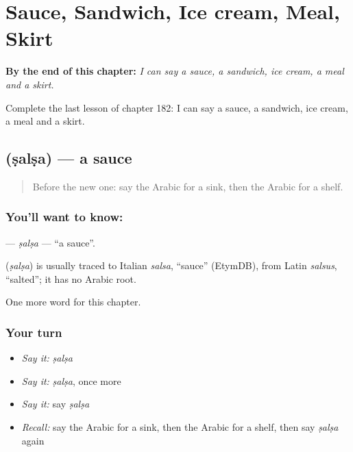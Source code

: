 
\chapter{Sauce, Sandwich, Ice cream, Meal, Skirt}
\label{ch:ar-sauce-sandwich-ice-cream-meal-skirt}

\begin{chapteropening}
\textbf{By the end of this chapter:} \emph{I can say a sauce, a sandwich, ice cream, a meal and a skirt.}

Complete the last lesson of chapter 182: I can say a sauce, a sandwich, ice cream, a meal and a skirt.
\end{chapteropening}

\section[\texorpdfstring{\ar{صلصة} (ṣalṣa)}{صلصة (ṣalṣa)}]{ (ṣalṣa) — a sauce}

\label{lesson:AR-C182-salsa}



\begin{quote}
Before the new one: say the Arabic for a sink, then the Arabic for a shelf.
\end{quote}

\subsection*{You'll want to know: }
\textbf{} — \emph{ṣalṣa} — \textquotedblleft{}a sauce\textquotedblright{}.

\begin{cousinweb}
\textbf{} (\emph{ṣalṣa}) is usually traced to Italian \emph{salsa}, \textquotedblleft{}sauce\textquotedblright{} (EtymDB), from Latin \emph{salsus}, \textquotedblleft{}salted\textquotedblright{}; it has no Arabic root.
\end{cousinweb}

\begin{grammarlens}[title={What you've built}]
One more word for this chapter.
\end{grammarlens}

\subsection*{Your turn}
\begin{itemize}
\raggedright
  \item \emph{Say it:} \emph{ṣalṣa}
  \item \emph{Say it:} \emph{ṣalṣa}, once more
  \item \emph{Say it:} say \emph{ṣalṣa}
  \item \emph{Recall:} say the Arabic for a sink, then the Arabic for a shelf, then say \emph{ṣalṣa} again
\end{itemize}

